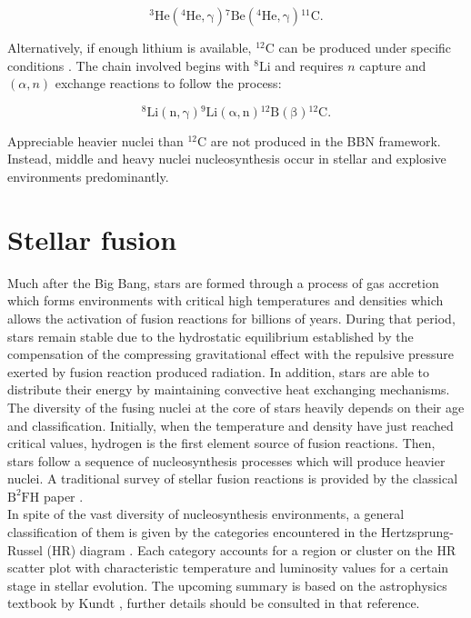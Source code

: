 \documentclass[openany]{book}
\begin{document}
\begin{equation}\label{eq:reaction_BBN_chain}
	\mathrm{{}^{3}He({}^{4}He, \gamma){}^{7}Be({}^{4}He, \gamma){}^{11}C}.
\end{equation}

Alternatively, if enough lithium is available, $\mathrm{{}^{12}C}$ can be produced under specific conditions \cite{su-qing_kai-su_yong-shou_neng-chuan_zhi-hong_2010}. The chain involved begins with $\mathrm{{}^{8}{Li}}$ and requires $n$ capture and $(\alpha,n)$ exchange reactions to follow the process: 

\begin{equation}\label{eq:reaction_BBN_CNO_path}
	\mathrm{{}^{8}Li(n, \gamma){}^{9}Li(\alpha, n){}^{12}B(\beta){}^{12}C}.
\end{equation}

Appreciable heavier nuclei than $\mathrm{{}^{12}C}$ are not produced in the BBN framework. Instead, middle and heavy nuclei nucleosynthesis occur in stellar and explosive environments predominantly.


\section{Stellar fusion}  \label{sec:StellarFusion}

Much after the Big Bang, stars are formed through a process of gas accretion which forms environments with critical high temperatures and densities which allows the activation of fusion reactions for billions of years. During that period, stars remain stable due to the hydrostatic equilibrium established by the compensation of the compressing gravitational effect with the repulsive pressure exerted by fusion reaction produced radiation. In addition, stars are able to distribute their energy by maintaining convective heat exchanging mechanisms. \\

The diversity of the fusing nuclei at the core of stars heavily depends on their age and classification.  Initially, when the  temperature and density have just reached critical values,  hydrogen is the first element source of fusion reactions. Then, stars follow a sequence of nucleosynthesis processes which will produce heavier nuclei. A traditional survey of stellar fusion reactions is provided by the classical $\mathrm{B^{2}FH}$ paper \cite{burbidge_burbidge_fowler_hoyle_1957}. \\



In spite of the vast diversity of nucleosynthesis environments, a general classification of them is given by the categories encountered in the Hertzsprung-Russel (HR) diagram \cite{arsentieva_shevchenko_2021}.  Each category accounts for a region or cluster on the HR scatter plot with characteristic temperature and luminosity values for a certain stage in stellar evolution. The upcoming summary is based on the astrophysics textbook by Kundt \cite{kundt_2005}, further details should be consulted in that reference. \\
\end{document}
